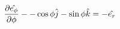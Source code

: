 \begin{equation}
  \pdv{\hat{e_\phi}}{\phi} - -\cos{\phi}\hat{j} - \sin{\phi}\hat{k} = -\hat{e_r}
\end{equation}
